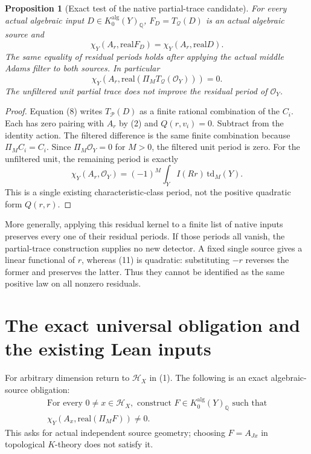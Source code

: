 \documentclass[11pt]{article}
\newcommand{\Q}{\mathbb Q}
\newcommand{\td}{\mathrm{td}}
\newcommand{\real}{\mathrm{real}}
\newtheorem{proposition}[theorem]{Proposition}
\begin{document}
\begin{proposition}[Exact test of the native partial-trace candidate]
For every actual algebraic input $D\in K_0^{\mathrm{alg}}(Y)_\Q$,
$F_D=T_{\mathscr Q}(D)$ is an actual algebraic source and
\[
 \boxed{\chi_Y(A_r,\real F_D)=\chi_Y(A_r,\real D).}
\]
The same equality of residual periods holds after applying
the actual middle Adams filter to both sources. In particular
\[
 \boxed{\chi_Y(A_r,\real(\Pi_MT_{\mathscr Q}(\mathcal O_Y)))=0.}
\]
The unfiltered unit partial trace does not improve the residual
period of $\mathcal O_Y$.
\end{proposition}
\begin{proof}
Equation (8) writes $T_{\mathscr P}(D)$ as a finite rational
combination of the $C_i$. Each has zero pairing with $A_r$
by (2) and $Q(r,v_i)=0$. Subtract from the identity action.
The filtered difference is the same finite combination because
$\Pi_MC_i=C_i$. Since $\Pi_M\mathcal O_Y=0$ for $M>0$,
the filtered unit period is zero.
For the unfiltered unit, the remaining period is exactly
\[
 \chi_Y(A_r,\mathcal O_Y)
   =(-1)^M\int_Y I(Rr)\,\td_M(Y).
\]
This is a single existing characteristic-class period, not the
positive quadratic form $Q(r,r)$.
\end{proof}
More generally, applying this residual kernel to a finite list
of native inputs preserves every one of their residual periods.
If those periods all vanish, the partial-trace construction
supplies no new detector. A fixed single source gives a linear
functional of $r$, whereas (11) is quadratic: substituting $-r$
reverses the former and preserves the latter. Thus they cannot
be identified as the same positive law on all nonzero residuals.

\section{The exact universal obligation and the existing Lean inputs}
For arbitrary dimension return to $\mathcal H_X$ in (1).
The following is an exact algebraic-source obligation:
\[
 \begin{gathered}
 \text{For every }0\ne x\in\mathcal H_X,\text{ construct }
 F\in K_0^{\mathrm{alg}}(Y)_\Q\text{ such that}\\
 \boxed{\chi_Y(A_x,\real(\Pi_MF))\ne0.}              \tag{17}
 \end{gathered}
\]
This asks for actual independent source geometry; choosing
$F=A_{Jx}$ in topological $K$-theory does not satisfy it.
\end{document}
